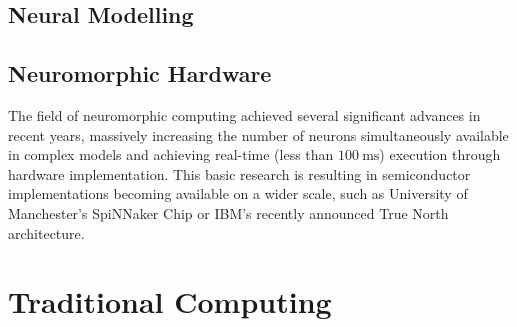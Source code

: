 \label{subsec:spiking_neural_nets}

\subsection{Neural Modelling}
\subsection{Neuromorphic Hardware}
The field of neuromorphic computing achieved several significant advances in recent years, massively increasing the number of neurons simultaneously available in complex models and achieving real-time (less than $\SI{100}{\milli\second}$) execution through hardware implementation. 
This basic research is resulting in semiconductor implementations becoming available on a wider scale, such as University of Manchester's \ac{SpiNNaker} Chip \cite{Furber2014} or IBM’s recently announced True North \cite{Akopyan2015} architecture.
\section{Traditional Computing}